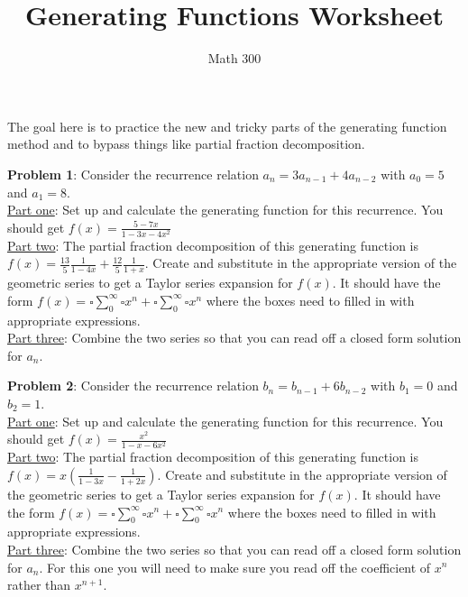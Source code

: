 \documentclass[11pt]{amsart}
\title{Generating Functions Worksheet}
\author{Math 300}
\begin{document}
\maketitle

The goal here is to practice the new and tricky parts of the generating function method and to bypass things like partial fraction decomposition. \vspace{.25cm}

{\bf  Problem 1}:  Consider the recurrence relation $a_n=3a_{n-1}+4a_{n-2}$ with $a_0=5$ and $a_1=8$.\\
\underline{Part one}:  Set up and calculate the generating function for this recurrence.  You should get $f(x)=\frac{5-7x}{1-3x-4x^2}$\\
\underline{Part two}:  The partial fraction decomposition of this generating function is $f(x)=\frac{13}{5} \frac{1}{1-4 x}+\frac{12}{5} \frac{1}{1+x}$.  Create and substitute in the appropriate version of the geometric series to get a Taylor series expansion for $f(x)$.  It should have the form $f(x)= \square \sum_0^\infty \square x^n +\square \sum_0^\infty \square x^n$ where the boxes need to filled in with appropriate expressions.\\
\underline{Part three}:  Combine the two series so that you can read off a closed form solution for $a_n$.
\vfill

{\bf  Problem 2}:  Consider the recurrence relation $b_n=b_{n-1}+6b_{n-2}$ with $b_1=0$ and $b_2=1$.\\
\underline{Part one}:  Set up and calculate the generating function for this recurrence.  You should get $f(x)=\frac{x^2
}{1-x-6x^2}$\\
\underline{Part two}:  The partial fraction decomposition of this generating function is $f(x)=x\left( \frac{1}{1-3 x}-\frac{1}{1+2x}\right)$.  Create and substitute in the appropriate version of the geometric series to get a Taylor series expansion for $f(x)$.  It should have the form $f(x)= \square \sum_0^\infty \square x^n +\square \sum_0^\infty \square x^n$ where the boxes need to filled in with appropriate expressions.\\
\underline{Part three}:  Combine the two series so that you can read off a closed form solution for $a_n$.  For this one you will need to make sure you read off the coefficient of $x^n$ rather than $x^{n+1}$.
\vfill
\end{document}
